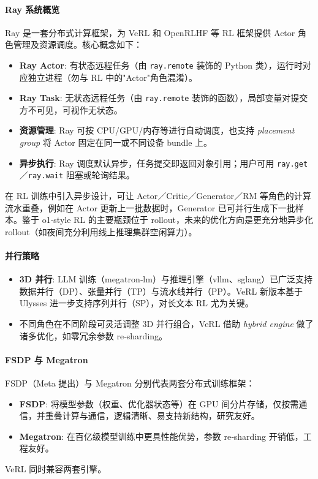 \documentclass{pkuthesis}
\begin{document}
\paragraph{Ray 系统概览}
Ray 是一套分布式计算框架，为 VeRL 和 OpenRLHF 等 RL 框架提供 Actor 角色管理及资源调度。核心概念如下：
\begin{itemize}
    \item \textbf{Ray Actor}: 有状态远程任务（由 \texttt{ray.remote} 装饰的 Python 类），运行时对应独立进程（勿与 RL 中的"Actor"角色混淆）。
    \item \textbf{Ray Task}: 无状态远程任务（由 \texttt{ray.remote} 装饰的函数），局部变量对提交方不可见，可视作无状态。
    \item \textbf{资源管理}: Ray 可按 CPU/GPU/内存等进行自动调度，也支持 \textit{placement group} 将 Actor 固定在同一或不同设备 bundle 上。
    \item \textbf{异步执行}: Ray 调度默认异步，任务提交即返回对象引用；用户可用 \texttt{ray.get}／\texttt{ray.wait} 阻塞或轮询结果。
\end{itemize}
在 RL 训练中引入异步设计，可让 Actor／Critic／Generator／RM 等角色的计算流水重叠，例如在 Actor 更新上一批数据时，Generator 已可并行生成下一批样本。鉴于 o1‐style RL 的主要瓶颈位于 rollout，未来的优化方向是更充分地异步化 rollout（如夜间充分利用线上推理集群空闲算力）。

\paragraph{并行策略}
\begin{itemize}
    \item \textbf{3D 并行}: LLM 训练（megatron‐lm）与推理引擎（vllm、sglang）已广泛支持数据并行（DP）、张量并行（TP）与流水线并行（PP）。VeRL 新版本基于 Ulysses 进一步支持序列并行（SP），对长文本 RL 尤为关键。
    \item 不同角色在不同阶段可灵活调整 3D 并行组合，VeRL 借助 \emph{hybrid engine} 做了诸多优化，如零冗余参数 re‐sharding。
\end{itemize}

\paragraph{FSDP 与 Megatron}
FSDP（Meta 提出）与 Megatron 分别代表两套分布式训练框架：
\begin{itemize}
    \item \textbf{FSDP}: 将模型参数（权重、优化器状态等）在 GPU 间分片存储，仅按需通信，并重叠计算与通信，逻辑清晰、易支持新结构，研究友好。
    \item \textbf{Megatron}: 在百亿级模型训练中更具性能优势，参数 re‐sharding 开销低，工程友好。
\end{itemize}
VeRL 同时兼容两套引擎。
\end{document}
